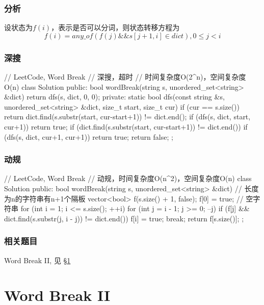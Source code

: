 \subsubsection{分析}
设状态为$f(i)$，表示是否可以分词，则状态转移方程为
$$
f(i) = any\_of(f(j) \&\& s[j+1,i] \in dict),  0 \leq j < i
$$


\subsubsection{深搜}
\begin{Code}
// LeetCode, Word Break
// 深搜，超时
// 时间复杂度O(2^n)，空间复杂度O(n)
class Solution {
public:
    bool wordBreak(string s, unordered_set<string> &dict) {
        return dfs(s, dict, 0, 0);
    }
private:
    static bool dfs(const string &s, unordered_set<string> &dict,
            size_t start, size_t cur) {
        if (cur == s.size()) {
            return dict.find(s.substr(start, cur-start+1)) != dict.end();
        }
        if (dfs(s, dict, start, cur+1)) return true;
        if (dict.find(s.substr(start, cur-start+1)) != dict.end())
            if (dfs(s, dict, cur+1, cur+1)) return true;
        return false;
    }
};
\end{Code}


\subsubsection{动规}
\begin{Code}
// LeetCode, Word Break
// 动规，时间复杂度O(n^2)，空间复杂度O(n)
class Solution {
public:
    bool wordBreak(string s, unordered_set<string> &dict) {
        // 长度为n的字符串有n+1个隔板
        vector<bool> f(s.size() + 1, false);
        f[0] = true; // 空字符串
        for (int i = 1; i <= s.size(); ++i) {
            for (int j = i - 1; j >= 0; --j) {
                if (f[j] && dict.find(s.substr(j, i - j)) != dict.end()) {
                    f[i] = true;
                    break;
                }
            }
        }
        return f[s.size()];
    }
};
\end{Code}


\subsubsection{相关题目}
\begindot
\item Word Break II, 见 \S \ref{sec:word-break-ii}
\myenddot


\section{Word Break II} %
\label{sec:word-break-ii}


